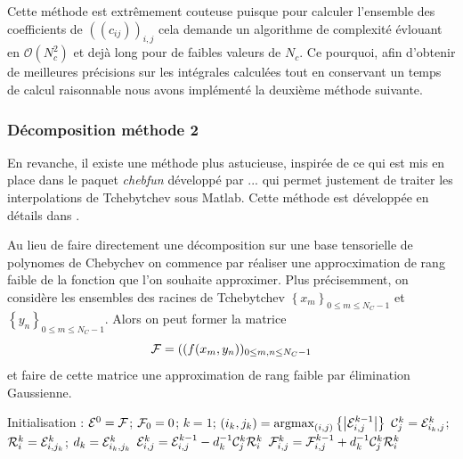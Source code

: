 \documentclass[10pt]{article}
\begin{document}
\begin{multicols}{2}
Cette méthode est extrêmement couteuse puisque pour calculer l'ensemble des coefficients de $((c_{ij}))_{i,j}$ cela demande un algorithme de complexité évlouant en $\mathcal{O}(N_c^2)$ et dejà long pour de faibles valeurs de $N_c$. Ce pourquoi, afin d'obtenir de meilleures précisions sur les intégrales calculées tout en conservant un temps de calcul raisonnable nous avons implémenté la deuxième méthode suivante.


\vspace*{11pt}

\subsubsection{Décomposition méthode 2}
En revanche, il existe une méthode plus astucieuse, inspirée de ce qui est mis en place dans le paquet \textit{chebfun} développé par ... qui permet justement de traiter les interpolations de Tchebytchev sous Matlab. Cette méthode est développée en détails dans \cite{TownsendThesis}. 

Au lieu de faire directement une décomposition sur une base tensorielle de polynomes de Chebychev on commence par réaliser une approcximation de rang faible de la fonction que l'on souhaite approximer. Plus précisemment, on considère les ensembles des racines de Tchebytchev $\left\{x_m\right\}_{0\le m \le N_C-1}$ et $\left\{y_n\right\}_{0\le m \le N_C-1}$. Alors on peut former la matrice 
\begin{equation}
	\mathcal{F}  =((f(x_m, y_n ))_{0\le m,n \le N_C-1}
\end{equation}
et faire de cette matrice une approximation de rang faible par élimination Gaussienne.

\begin{algorithm}[H]
  \begin{algorithmic}[1]
    \STATE Initialisation : $\mathcal{E} ^0 = \mathcal{F} $; $\mathcal{F} _0 = 0$; $k = 1$;
    \STATE $(i_k, j_k) =  {\text{argmax}}_{(i,j)} \left\{\left| \mathcal{E} ^{k-1}_{i,j} \right| \right\}$
    \STATE $\mathcal{C} ^k_{j} = \mathcal{E} ^k_{i_k,j}$;  $\mathcal{R} ^k_{i} = \mathcal{E} ^k_{i,j_k}$; $d_k = \mathcal{E} ^k_{i_k,j_k}$
    \STATE $\mathcal{E} ^k_{i,j} = \mathcal{E} ^{k-1}_{i,j} - d_k^{-1}\mathcal{C} ^k_{j}\mathcal{R} ^k_{i}$
    \STATE $\mathcal{F} ^k_{i,j} = \mathcal{F} ^{k-1}_{i,j} + d_k^{-1}\mathcal{C} ^k_{j}\mathcal{R} ^k_{i}$
    \ENDWHILE
  \end{algorithmic}
\end{algorithm}


\end{multicols}
\end{document}
